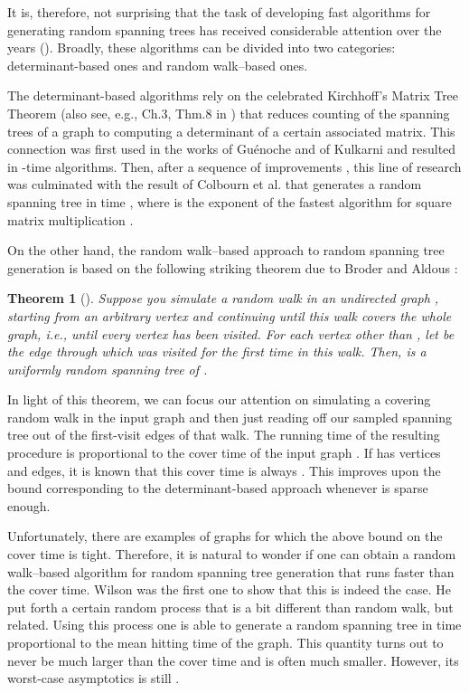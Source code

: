 \documentclass[11pt, letterpaper]{article}
\newtheorem{theorem}{Theorem}[section]
\begin{document}
It is, therefore, not surprising that the task of developing fast algorithms for generating random spanning trees has received considerable attention over the years (\cite{Guenoche83,Kulkarni90,ColbournDM88,ColbournDN89,ColbournMN96,Aldous90,Broder89,Wilson96,KelnerM09}). Broadly, these algorithms can be divided into two categories: determinant-based ones and random walk--based ones. 

The determinant-based algorithms rely on the celebrated Kirchhoff's Matrix Tree Theorem \cite{Kirchhoff47} (also see, e.g., Ch.3, Thm.8 in \cite{Bollobas79}) that reduces counting of the spanning trees of a graph to computing a determinant of a certain associated matrix. This connection was first used in the works of Gu\'enoche \cite{Guenoche83} and of Kulkarni \cite{Kulkarni90} and resulted in -time algorithms. Then, after a sequence of improvements \cite{ColbournDM88,ColbournDN89}, this line of research was culminated with the result of Colbourn et al. \cite{ColbournMN96} that generates a random spanning tree in time , where  is the exponent of the fastest algorithm for square matrix multiplication \cite{CoppersmithW90,Vassilevska12}.

On the other hand, the random walk--based approach to random spanning tree generation is based on the following striking theorem due to Broder \cite{Broder89} and Aldous \cite{Aldous90}:


\begin{theorem}[\cite{Aldous90,Broder89}] \label{thm:rand_tree_via_rand_walk}
Suppose you simulate a random walk in an undirected graph , starting from an arbitrary vertex  and continuing until this walk covers the whole graph, i.e., until every vertex has been visited. For each vertex  other than , let  be the edge through which  was visited for the first time in this walk. Then,  is a uniformly random spanning tree of .
\end{theorem}

In light of this theorem, we can focus our attention on simulating a covering random walk in the input graph  and then just reading off our sampled spanning tree out of the first-visit edges of that walk. The running time of the resulting procedure is proportional to the cover time of the input graph . If  has  vertices and  edges, it is known that this cover time is always  \cite{AleliunasKLLR79}. This improves upon the  bound corresponding to the determinant-based approach whenever  is sparse enough. 

Unfortunately, there are examples of graphs for which the above  bound on the cover time is tight. Therefore, it is natural to wonder if one can obtain a random walk--based algorithm for random spanning tree generation that runs faster than the cover time. Wilson \cite{Wilson96} was the first one to show that this is indeed the case. He put forth a certain random process that is a bit different than random walk, but related. Using this process one is able to generate a random spanning tree in time proportional to the mean hitting time of the graph. This quantity turns out to never be much larger than the cover time and is often much smaller. However, its worst-case asymptotics is still .
\end{document}
